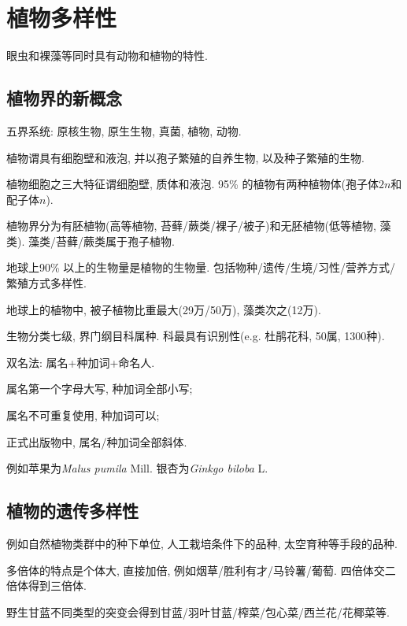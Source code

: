 \documentclass{ctexart}
\begin{document}
\section{植物多样性} %
\label{sec:植物多样性}

\begin{remark}
    眼虫和裸藻等同时具有动物和植物的特性.
\end{remark}

\subsection{植物界的新概念} %
\label{sub:植物界的新概念}

五界系统: 原核生物, 原生生物, 真菌, 植物, 动物.
\begin{definition}
    植物谓具有细胞壁和液泡, 并以孢子繁殖的自养生物, 以及种子繁殖的生物.
\end{definition}
植物细胞之三大特征谓细胞壁, 质体和液泡. 95\% 的植物有两种植物体(孢子体$2n$和配子体$n$).
\par
植物界分为有胚植物(高等植物, 苔藓/蕨类/裸子/被子)和无胚植物(低等植物, 藻类). 藻类/苔藓/蕨类属于孢子植物.
\par
地球上90\% 以上的生物量是植物的生物量. 包括物种/遗传/生境/习性/营养方式/繁殖方式多样性.
\par
地球上的植物中, 被子植物比重最大(29万/50万), 藻类次之(12万).
\par
生物分类七级, 界门纲目科属种. 科最具有识别性(e.g. 杜鹃花科, 50属, 1300种).
\par
双名法: 属名+种加词+命名人.
\begin{cenum}
    \item 属名第一个字母大写, 种加词全部小写;
    \item 属名不可重复使用, 种加词可以;
    \item 正式出版物中, 属名/种加词全部斜体.
\end{cenum}
例如苹果为\textit{Malus pumila} Mill. 银杏为\textit{Ginkgo biloba} L.
\par



\subsection{植物的遗传多样性} %
\label{sub:植物的遗传多样性}

例如自然植物类群中的种下单位, 人工栽培条件下的品种, 太空育种等手段的品种.
\par
多倍体的特点是个体大, 直接加倍, 例如烟草/胜利有才/马铃薯/葡萄. 四倍体交二倍体得到三倍体.
\par
野生甘蓝不同类型的突变会得到甘蓝/羽叶甘蓝/榨菜/包心菜/西兰花/花椰菜等.
\par
\end{document}

